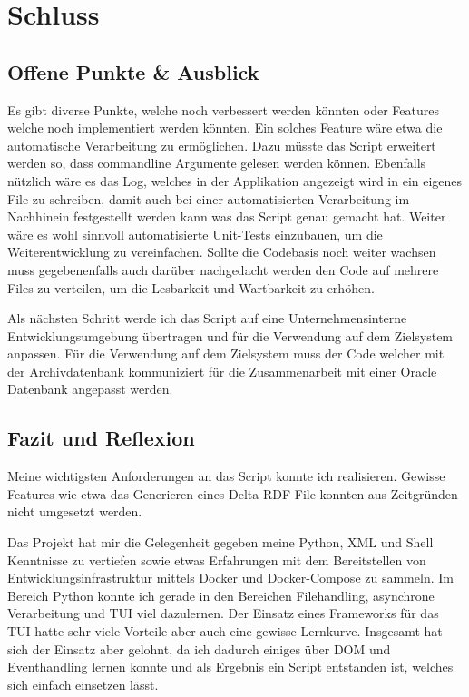 \documentclass[a4paper,oneside, 12pt]{report}
\begin{document}
\chapter{Schluss}\label{sec:schluss}
\section{Offene Punkte \& Ausblick}
Es gibt diverse Punkte, welche noch verbessert werden könnten oder Features welche noch implementiert werden könnten. Ein solches Feature wäre etwa die automatische Verarbeitung zu ermöglichen. Dazu müsste das Script erweitert werden so, dass commandline Argumente gelesen werden können. Ebenfalls nützlich wäre es das Log, welches in der Applikation angezeigt wird in ein eigenes File zu schreiben, damit auch bei einer automatisierten Verarbeitung im Nachhinein festgestellt werden kann was das Script genau gemacht hat. Weiter wäre es wohl sinnvoll automatisierte Unit-Tests einzubauen, um die Weiterentwicklung zu vereinfachen. Sollte die Codebasis noch weiter wachsen muss gegebenenfalls auch darüber nachgedacht werden den Code auf mehrere Files zu verteilen, um die Lesbarkeit und Wartbarkeit zu erhöhen.

Als nächsten Schritt werde ich das Script auf eine Unternehmensinterne Entwicklungsumgebung übertragen und für die Verwendung auf dem Zielsystem anpassen. Für die Verwendung auf dem Zielsystem muss der Code welcher mit der Archivdatenbank kommuniziert für die Zusammenarbeit mit einer Oracle Datenbank angepasst werden.

\section{Fazit und Reflexion}
Meine wichtigsten Anforderungen an das Script konnte ich realisieren. Gewisse Features wie etwa das Generieren eines Delta-RDF File konnten aus Zeitgründen nicht umgesetzt werden.

Das Projekt hat mir die Gelegenheit gegeben meine Python, XML und Shell Kenntnisse zu vertiefen sowie etwas Erfahrungen mit dem Bereitstellen von Entwicklungsinfrastruktur mittels Docker und Docker-Compose zu sammeln. Im Bereich Python konnte ich gerade in den Bereichen Filehandling, asynchrone Verarbeitung und \ac{TUI} viel dazulernen. Der Einsatz eines Frameworks für das TUI hatte sehr viele Vorteile aber auch eine gewisse Lernkurve. Insgesamt hat sich der Einsatz aber gelohnt, da ich dadurch einiges über DOM und Eventhandling lernen konnte und als Ergebnis ein Script entstanden ist, welches sich einfach einsetzen lässt.
\end{document}
